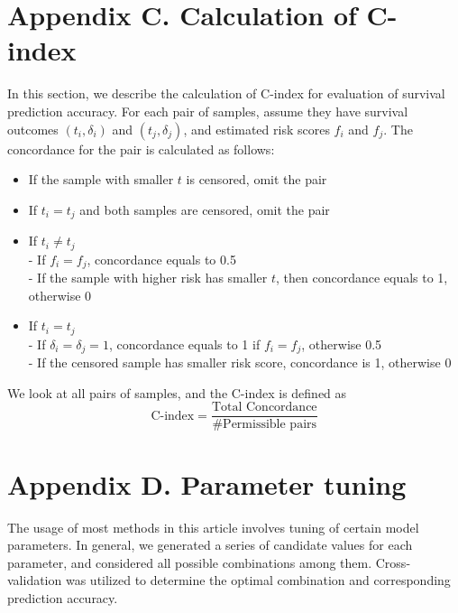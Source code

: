 \documentclass[a4paper,12pt]{article}
\begin{document}
	\newpage
	\section*{Appendix C. Calculation of C-index}
	\label{sec:Cind}
	In this section, we describe the calculation of C-index for evaluation of survival prediction accuracy. For each pair of samples, assume they have survival outcomes $(t_i, \delta_i)$ and $(t_j, \delta_j)$, and estimated risk scores $f_i$ and $f_j$. The concordance for the pair is calculated as follows:
	\begin{itemize}
		\item If the sample with smaller $t$ is censored, omit the pair
		\item If $t_i = t_j$ and both samples are censored, omit the pair
		\item If $t_i \neq t_j$\\
		\qquad - If  $f_i = f_j$, concordance equals to 0.5\\
		\qquad - If the sample with higher risk has smaller $t$, then concordance equals to 1, otherwise 0
		\item If $t_i = t_j$\\
		\qquad - If $\delta_i = \delta_j = 1$, concordance equals to 1 if $f_i = f_j$, otherwise 0.5\\
		\qquad - If the censored sample has smaller risk score, concordance is 1, otherwise 0
		
	\end{itemize}
	We look at all pairs of samples, and the C-index is defined as
	$$\text{C-index} = \frac{ \text{Total Concordance} }{\# \text{Permissible pairs} }$$
	\newpage
	\section*{Appendix D. Parameter tuning}
	\label{sec:tune}
	The usage of most methods in this article involves tuning of certain model parameters. In general, we generated a series of candidate values for each parameter, and considered all possible combinations among them. Cross-validation was utilized to determine the optimal combination and corresponding prediction accuracy.
	
\end{document}
